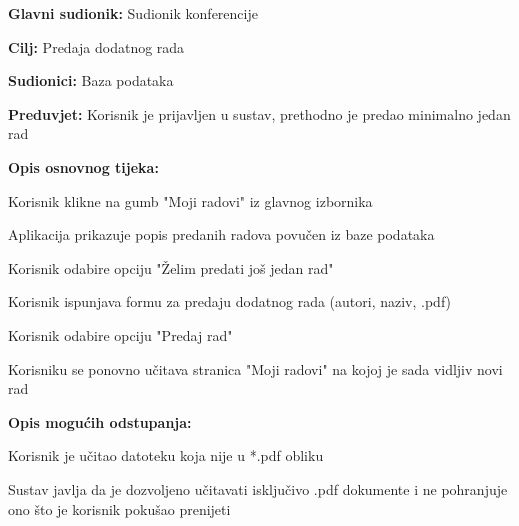 					\begin{packed_item}
						
						\item \textbf{Glavni sudionik: } Sudionik konferencije
						\item  \textbf{Cilj:} Predaja dodatnog rada
						\item  \textbf{Sudionici:} Baza podataka
						\item  \textbf{Preduvjet:} Korisnik je prijavljen u sustav, prethodno je predao minimalno jedan rad
						\item  \textbf{Opis osnovnog tijeka:}
						                                                                          
						\item[] \begin{packed_enum}
							\item Korisnik klikne na gumb "Moji radovi" iz glavnog izbornika
							\item Aplikacija prikazuje popis predanih radova povučen iz baze podataka
							\item Korisnik odabire opciju "Želim predati još jedan rad"
							\item Korisnik ispunjava formu za predaju dodatnog rada (autori, naziv, .pdf)
							\item Korisnik odabire opciju "Predaj rad"
							\item Korisniku se ponovno učitava stranica "Moji radovi" na kojoj je sada vidljiv novi rad 
							
							
						\end{packed_enum}
						
						\item  \textbf{Opis mogućih odstupanja:}
						        
						\item[] \begin{packed_item}
							
							\item[4.a]  Korisnik je učitao datoteku koja nije u *.pdf obliku
							\item[] \begin{packed_enum}
								
								\item Sustav javlja da je dozvoljeno učitavati isključivo .pdf dokumente i ne pohranjuje ono što je korisnik pokušao prenijeti
								      
							\end{packed_enum}
							

\end{packed_item}
\end{packed_item}
